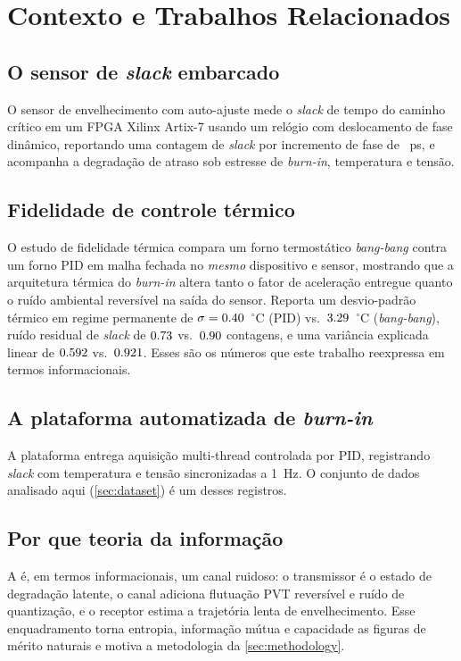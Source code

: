 \section{Contexto e Trabalhos Relacionados}
\label{sec:background}


\subsection{O sensor de \emph{slack} embarcado}
O sensor de envelhecimento com auto-ajuste \cite{nogueira_sensor} mede o
\emph{slack} de tempo do caminho crítico em um FPGA Xilinx Artix-7 usando um
relógio com deslocamento de fase dinâmico, reportando uma contagem de
\emph{slack} por incremento de fase de \valLSBps~ps, e acompanha a degradação
de atraso sob estresse de \emph{burn-in}, temperatura e tensão.

\subsection{Fidelidade de controle térmico}
O estudo de fidelidade térmica \cite{alencar_fidelity} compara um forno
termostático \emph{bang-bang} contra um forno PID em malha fechada no
\emph{mesmo} dispositivo e sensor, mostrando que a arquitetura térmica do
\emph{burn-in} altera tanto o fator de aceleração entregue quanto o ruído
ambiental reversível na saída do sensor. Reporta um desvio-padrão térmico em
regime permanente de $\sigma=0.40$~$^\circ$C (PID) vs.\
$3.29$~$^\circ$C (\emph{bang-bang}), ruído residual de
\emph{slack} de $0.73$ vs.\ $0.90$ contagens, e uma
variância explicada linear de $0.592$ vs.\ $0.921$. Esses são
os números que este trabalho reexpressa em termos informacionais.

\subsection{A plataforma automatizada de \emph{burn-in}}
A plataforma \cite{alencarfilho_tcc} entrega aquisição multi-thread
controlada por PID, registrando \emph{slack} com temperatura e tensão
sincronizadas a 1~Hz. O conjunto de dados analisado aqui (\cref{sec:dataset})
é um desses registros.

\subsection{Por que teoria da informação}
A  é, em termos informacionais, um canal ruidoso: o
transmissor é o estado de degradação latente, o canal adiciona flutuação PVT
reversível e ruído de quantização, e o receptor estima a trajetória lenta de
envelhecimento. Esse enquadramento torna entropia, informação mútua e
capacidade as figuras de mérito naturais e motiva a metodologia da
\cref{sec:methodology}.

